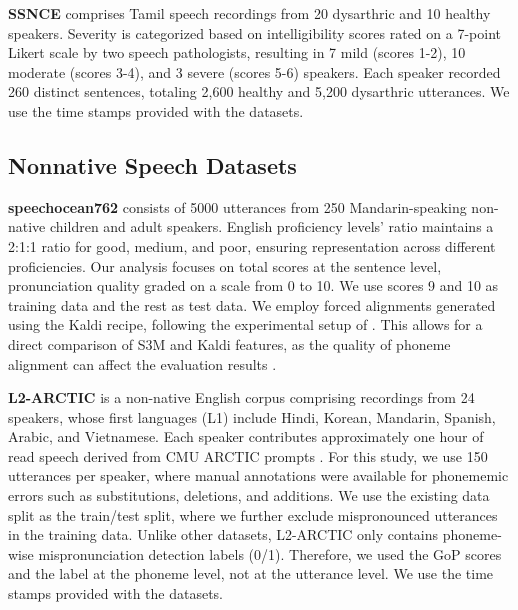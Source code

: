 \textbf{SSNCE} \citep{ta2016dysarthric} comprises Tamil speech recordings from 20 dysarthric and 10 healthy speakers. Severity is categorized based on intelligibility scores rated on a 7-point Likert scale by two speech pathologists, resulting in 7 mild (scores 1-2), 10 moderate (scores 3-4), and 3 severe (scores 5-6) speakers. Each speaker recorded 260 distinct sentences, totaling 2,600 healthy and 5,200 dysarthric utterances. 
We use the time stamps provided with the datasets. 


\subsection{Nonnative Speech Datasets}\label{subsubsec:nonnative}
\textbf{speechocean762} \citep{speechocean762} consists of 5000 utterances from 250 Mandarin-speaking non-native children and adult speakers. 
English proficiency levels' ratio maintains a 2:1:1 ratio for good, medium, and poor, ensuring representation across different proficiencies.
Our analysis focuses on total scores at the sentence level, pronunciation quality graded on a scale from 0 to 10.
We use scores 9 and 10 as training data and the rest as test data.
We employ forced alignments generated using the Kaldi recipe, following the experimental setup of \citet{speechocean762}. 
This allows for a direct comparison of S3M and Kaldi features, as the quality of phoneme alignment can affect the evaluation results \citep{mackenzie2020assessing}.

\textbf{L2-ARCTIC} \citep{zhao2018l2} is a non-native English corpus comprising recordings from 24 speakers, whose first languages (L1) include Hindi, Korean, Mandarin, Spanish, Arabic, and Vietnamese. 
Each speaker contributes approximately one hour of read speech derived from CMU ARCTIC prompts \citep{kominek2004cmu}.
For this study, we use 150 utterances per speaker, where manual annotations were available for phonememic errors such as substitutions, deletions, and additions.
We use the existing data split as the train/test split, where we further exclude mispronounced utterances in the training data.
Unlike other datasets, L2-ARCTIC only contains phoneme-wise mispronunciation detection labels (0/1).
Therefore, we used the GoP scores and the label at the phoneme level, not at the utterance level.
We use the time stamps provided with the datasets. 



